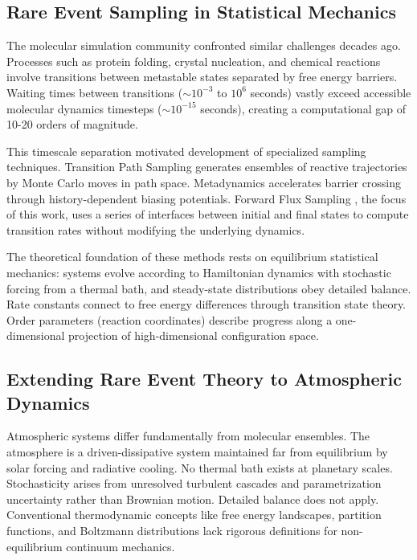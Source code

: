 \documentclass[11pt]{article}
\begin{document}
\subsection{Rare Event Sampling in Statistical Mechanics}

The molecular simulation community confronted similar challenges decades ago. Processes such as protein folding, crystal nucleation, and chemical reactions involve transitions between metastable states separated by free energy barriers. Waiting times between transitions ($\sim 10^{-3}$ to $10^6$ seconds) vastly exceed accessible molecular dynamics timesteps ($\sim 10^{-15}$ seconds), creating a computational gap of 10-20 orders of magnitude.

This timescale separation motivated development of specialized sampling techniques. Transition Path Sampling \citep{bolhuis2002transition} generates ensembles of reactive trajectories by Monte Carlo moves in path space. Metadynamics \citep{laio2002escaping} accelerates barrier crossing through history-dependent biasing potentials. Forward Flux Sampling \citep{allen2006forward,allen2009forward}, the focus of this work, uses a series of interfaces between initial and final states to compute transition rates without modifying the underlying dynamics.

The theoretical foundation of these methods rests on equilibrium statistical mechanics: systems evolve according to Hamiltonian dynamics with stochastic forcing from a thermal bath, and steady-state distributions obey detailed balance. Rate constants connect to free energy differences through transition state theory. Order parameters (reaction coordinates) describe progress along a one-dimensional projection of high-dimensional configuration space.

\subsection{Extending Rare Event Theory to Atmospheric Dynamics}

Atmospheric systems differ fundamentally from molecular ensembles. The atmosphere is a driven-dissipative system maintained far from equilibrium by solar forcing and radiative cooling. No thermal bath exists at planetary scales. Stochasticity arises from unresolved turbulent cascades and parametrization uncertainty rather than Brownian motion. Detailed balance does not apply. Conventional thermodynamic concepts like free energy landscapes, partition functions, and Boltzmann distributions lack rigorous definitions for non-equilibrium continuum mechanics.
\end{document}
